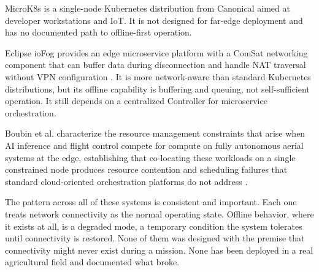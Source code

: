 MicroK8s is a single-node Kubernetes distribution from Canonical aimed at developer workstations and IoT. It is not designed for far-edge deployment and has no documented path to offline-first operation.

Eclipse ioFog provides an edge microservice platform with a ComSat networking component that can buffer data during disconnection and handle NAT traversal without VPN configuration \cite{iofog2019eclipse}. It is more network-aware than standard Kubernetes distributions, but its offline capability is buffering and queuing, not self-sufficient operation. It still depends on a centralized Controller for microservice orchestration.

Boubin et al. characterize the resource management constraints that arise when AI inference and flight control compete for compute on fully autonomous aerial systems at the edge, establishing that co-locating these workloads on a single constrained node produces resource contention and scheduling failures that standard cloud-oriented orchestration platforms do not address \cite{boubin2019managing}.

The pattern across all of these systems is consistent and important. Each one treats network connectivity as the normal operating state. Offline behavior, where it exists at all, is a degraded mode, a temporary condition the system tolerates until connectivity is restored. None of them was designed with the premise that connectivity might never exist during a mission. None has been deployed in a real agricultural field and documented what broke.

